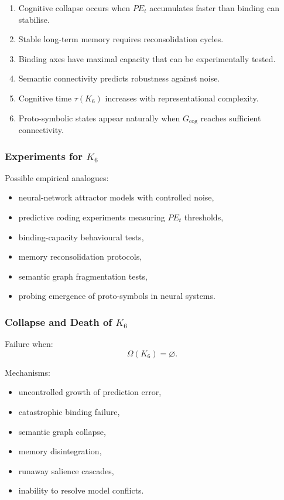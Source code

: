 \begin{enumerate}
    \item Cognitive collapse occurs when $PE_t$ accumulates faster than binding can stabilise.
    \item Stable long-term memory requires reconsolidation cycles.
    \item Binding axes have maximal capacity that can be experimentally tested.
    \item Semantic connectivity predicts robustness against noise.
    \item Cognitive time $\tau(K_6)$ increases with representational complexity.
    \item Proto-symbolic states appear naturally when $G_{\mathrm{cog}}$ reaches sufficient connectivity.
\end{enumerate}

\subsubsection{Experiments for \texorpdfstring{$K_6$}{K_6}}

Possible empirical analogues:
\begin{itemize}
    \item neural-network attractor models with controlled noise,
    \item predictive coding experiments measuring $PE_t$ thresholds,
    \item binding-capacity behavioural tests,
    \item memory reconsolidation protocols,
    \item semantic graph fragmentation tests,
    \item probing emergence of proto-symbols in neural systems.
\end{itemize}

\subsubsection{Collapse and Death of \texorpdfstring{$K_6$}{K_6}}

Failure when:
\[
\Omega(K_6) = \varnothing.
\]

Mechanisms:
\begin{itemize}
    \item uncontrolled growth of prediction error,
    \item catastrophic binding failure,
    \item semantic graph collapse,
    \item memory disintegration,
    \item runaway salience cascades,
    \item inability to resolve model conflicts.
\end{itemize}

